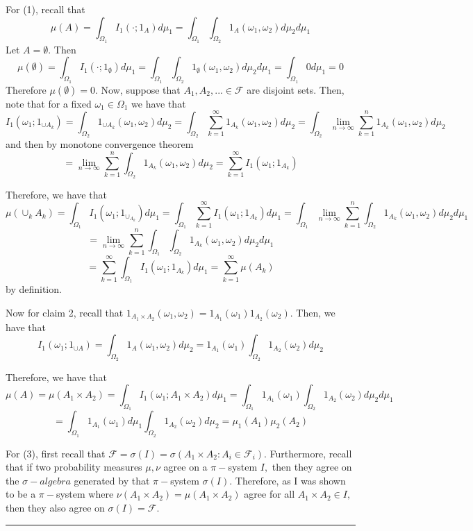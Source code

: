 \documentclass[twoside]{article}
\newenvironment{proof}{{\bf Proof:}}{\hfill\rule{2mm}{2mm}}
\newcommand{\sigmalgebra}{\mathcal{F}}
\newcommand{\sa}{\sigma-algebra}
\begin{document}
\begin{proof} For (1), recall that 
$$
\mu(A) = \int_{\Omega_{1}}I_1(\cdot; 1_A)d\mu_1 = \int_{\Omega_{1}}\int_{\Omega_2}1_A(\omega_1, \omega_2)d\mu_2d\mu_1 
$$
Let $A = \emptyset.$ Then 
$$
\mu(\emptyset) = \int_{\Omega_{1}}I_1(\cdot; 1_{\emptyset})d\mu_1 = \int_{\Omega_{1}}\int_{\Omega_2}1_{\emptyset}(\omega_1, \omega_2)d\mu_2d\mu_1  = \int_{\Omega_{1}} 0 d\mu_1 = 0
$$
Therefore $\mu(\emptyset) = 0.$ Now, suppose that $A_1, A_2, ... \in \sigmalgebra$ are disjoint sets. Then, note that for a fixed $\omega_1 \in \Omega_1$ we have that 
$$
I_1(\omega_1;1_{\cup A_k}) = \int_{\Omega_2}1_{\cup A_k}(\omega_1, \omega_2)d\mu_2 = \int_{\Omega_2}\sum_{k=1}^{\infty}1_{A_{k}}(\omega_1, \omega_2)d\mu_2 = \int_{\Omega_2}\lim_{n \rightarrow \infty}\sum_{k=1}^{n}1_{A_{k}}(\omega_1, \omega_2)d\mu_2
$$
and then by monotone convergence theorem 
\begin{equation}
= \lim_{n \rightarrow \infty}\sum_{k=1}^{n}\int_{\Omega_2}1_{A_{k}}(\omega_1, \omega_2)d\mu_2 = \sum_{k=1}^{\infty}I_1(\omega_1; 1_{A_{k}})
\tag{*}
\end{equation}

Therefore, we have that 
$$
\mu(\cup_kA_k) = \int_{\Omega_1}I_1(\omega_1; 1_{\cup_{A_{k}}})d\mu_1 = \int_{\Omega_{1}}\sum_{k=1}^{\infty}I_1(\omega_1; 1_{A_{k}})d\mu_1 = \int_{\Omega_{1}}\lim_{n \rightarrow \infty}\sum_{k=1}^{n}\int_{\Omega_2}1_{A_{k}}(\omega_1, \omega_2)d\mu_2 d\mu_1
$$
$$
= \lim_{n \rightarrow \infty}\sum_{k=1}^{n}\int_{\Omega_{1}}\int_{\Omega_2}1_{A_{k}}(\omega_1, \omega_2)d\mu_2 d\mu_1
$$
$$
= \sum_{k=1}^{\infty}\int_{\Omega_1}I_1(\omega_1; 1_{A_{k}})d\mu_1 = \sum_{k=1}^{\infty}\mu(A_k)
$$
by definition.

Now for claim 2, recall that $1_{A_{1}\times A_{2}}(\omega_1, \omega_2) = 1_{A_{1}}(\omega_1)1_{A_{2}}(\omega_2).$ Then, we have that 
$$
I_1(\omega_1;1_{\cup A}) = \int_{\Omega_{2}}1_A(\omega_1, \omega_2)d\mu_2 = 1_{A_{1}}(\omega_1)\int_{\Omega_{2}}1_{A_{2}}(\omega_2)d\mu_2
$$

Therefore, we have that 
$$
\mu(A) = \mu(A_1 \times A_2) = \int_{\Omega_{1}}I_1(\omega_1; A_1 \times A_2)d\mu_1 = \int_{\Omega_{1}}1_{A_{1}}(\omega_1)\int_{\Omega_{2}}1_{A_{2}}(\omega_2)d\mu_2d\mu_1
$$
$$
= \int_{\Omega_{1}}1_{A_{1}}(\omega_1)d\mu_1\int_{\Omega_{2}}1_{A_{2}}(\omega_2)d\mu_2 = \mu_1(A_1)\mu_2(A_2)
$$

For (3), first recall that $\sigmalgebra = \sigma(I) = \sigma(A_1 \times A_2: A_i \in \sigmalgebra_i)$. Furthermore, recall that if two probability measures $\mu, \nu$ agree on a $\pi-$system $I,$ then they agree on the $\sa$ generated by that $\pi-$system $\sigma(I).$ Therefore, as I was shown to be a $\pi-$system where $\nu(A_1 \times A_2) = \mu(A_1 \times A_2)$ agree for all $A_1 \times A_2 \in I,$ then they also agree on $\sigma(I) = \sigmalgebra.$
\end{proof}
\end{document}
